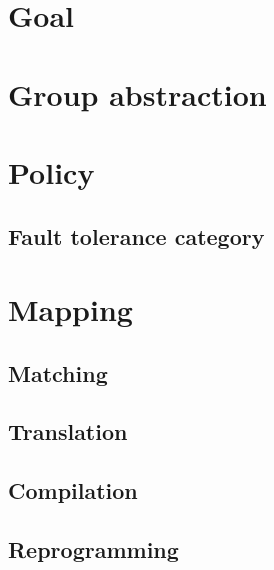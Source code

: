 \section{Goal}


\section{Group abstraction}


\section{Policy}

\subsection{Fault tolerance category}


\section{Mapping}

\subsection{Matching}

\subsection{Translation}

\subsection{Compilation}

\subsection{Reprogramming}

